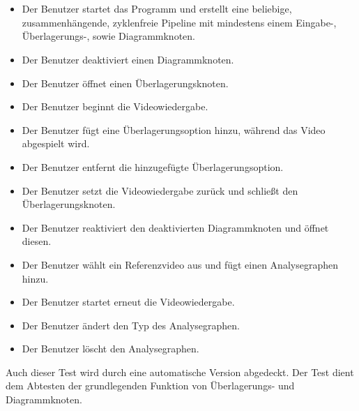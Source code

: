 \paragraph{} ~\\
 
\begin{itemize}
	\item Der Benutzer startet das Programm und erstellt eine beliebige, zusammenhängende, zyklenfreie Pipeline mit mindestens einem Eingabe-, Überlagerungs-, sowie Diagrammknoten.
	\item Der Benutzer deaktiviert einen Diagrammknoten.
	\item Der Benutzer öffnet einen Überlagerungsknoten.
	\item Der Benutzer beginnt die Videowiedergabe.
	\item Der Benutzer fügt eine Überlagerungsoption hinzu, während das Video abgespielt wird.
	\item Der Benutzer entfernt die hinzugefügte Überlagerungsoption.
	\item Der Benutzer setzt die Videowiedergabe zurück und schließt den Überlagerungsknoten.
	\item Der Benutzer reaktiviert den deaktivierten Diagrammknoten und öffnet diesen.
	\item Der Benutzer wählt ein Referenzvideo aus und fügt einen Analysegraphen hinzu.
	\item Der Benutzer startet erneut die Videowiedergabe.
	\item Der Benutzer ändert den Typ des Analysegraphen.
	\item Der Benutzer löscht den Analysegraphen.
\end{itemize}

Auch dieser Test wird durch eine automatische Version abgedeckt. Der Test dient dem Abtesten der grundlegenden Funktion von Überlagerungs- und Diagrammknoten.
